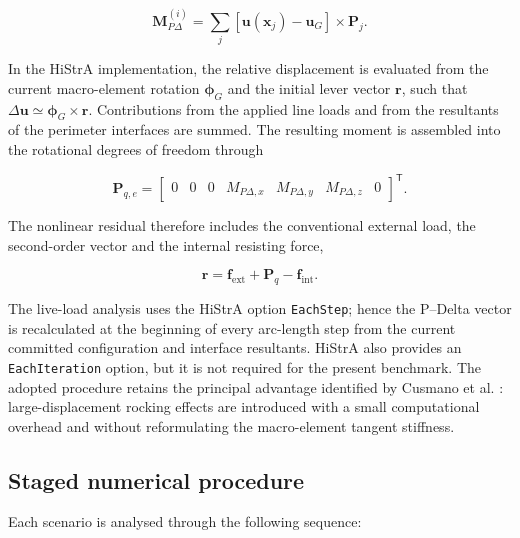 \begin{equation}
\mathbf{M}_{P\Delta}^{(i)}=
\sum_j\left[\mathbf{u}(\mathbf{x}_j)-\mathbf{u}_G\right]
\times\mathbf{P}_j.
\label{eq:wall-validation-pdelta-interface}
\end{equation}

In the HiStrA implementation, the relative displacement is evaluated from the
current macro-element rotation $\boldsymbol{\phi}_G$ and the initial lever
vector $\mathbf{r}$, such that
$\Delta\mathbf{u}\simeq\boldsymbol{\phi}_G\times\mathbf{r}$. Contributions
from the applied line loads and from the resultants of the perimeter
interfaces are summed. The resulting moment is assembled into the rotational
degrees of freedom through

\begin{equation}
\mathbf{P}_{q,e}=
\begin{bmatrix}
0&0&0&M_{P\Delta,x}&M_{P\Delta,y}&M_{P\Delta,z}&0
\end{bmatrix}^{\mathsf{T}}.
\label{eq:wall-validation-pdelta-vector}
\end{equation}

The nonlinear residual therefore includes the conventional external load,
the second-order vector and the internal resisting force,

\begin{equation}
\mathbf{r}=\mathbf{f}_{\mathrm{ext}}+\mathbf{P}_q-
\mathbf{f}_{\mathrm{int}}.
\label{eq:wall-validation-residual}
\end{equation}

The live-load analysis uses the HiStrA option \texttt{EachStep}; hence the
P--Delta vector is recalculated at the beginning of every arc-length step from
the current committed configuration and interface resultants. HiStrA also
provides an \texttt{EachIteration} option, but it is not required for the
present benchmark. The adopted procedure retains the principal advantage
identified by Cusmano et al. \cite{Cusmano2023}: large-displacement rocking effects are
introduced with a small computational overhead and without reformulating the
macro-element tangent stiffness.

\subsection{Staged numerical procedure}
\label{sec:wall-validation-procedure}

Each scenario is analysed through the following sequence:


